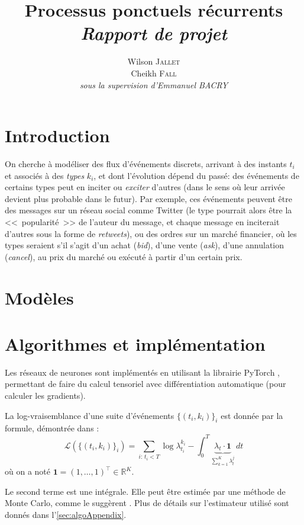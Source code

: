 \documentclass[11pt]{article}
\title{\textbf{Processus ponctuels récurrents}\\
	\textit{Rapport de projet}  
}
\author{
  Wilson \textsc{Jallet}\\
  Cheikh \textsc{Fall}\\
  \textit{sous la supervision d'Emmanuel BACRY}
}
\newcommand{\RR}{\mathbb{R}}
\begin{document}
\maketitle

\section{Introduction}

On cherche à modéliser des flux d'événements discrets, arrivant à des instants $t_i$ et associés à des \textit{types} $k_i$, et dont l'évolution dépend du passé: des événements de certains types peut en inciter ou \textit{exciter} d'autres (dans le sens où leur arrivée devient plus probable dans le futur). Par exemple, ces événements peuvent être des messages sur un réseau social comme Twitter (le type pourrait alors être la <<~popularité~>> de l'auteur du message, et chaque message en inciterait d'autres sous la forme de \textit{retweets}), ou des ordres sur un marché financier, où les types seraient s'il s'agit d'un achat (\textit{bid}), d'une vente (\textit{ask}), d'une annulation (\textit{cancel}), au prix du marché ou exécuté à partir d'un certain prix.

\section{Modèles}




\section{Algorithmes et implémentation}

Les réseaux de neurones sont implémentés en utilisant la librairie \textsf{PyTorch} \cite{paszke2017automatic}, permettant de faire du calcul tensoriel avec différentiation automatique (pour calculer les gradients).

La log-vraisemblance d'une suite d'événements $\{(t_i,k_i)\}_i$ est donnée par la formule, démontrée dans \autocite{meiEisnerNeuralHawkes}:
\begin{equation}\label{eq:explicitLikelihood}
\mathcal{L}\left(\{(t_i,k_i)\}_i\right)
=
\sum_{i:\,t_i < T} \log\lambda^{k_i}_{t_i} - \int_0^T \underbrace{\lambda_t\cdot\mathbf{1}}_{\sum_{k=1}^K\lambda^j_t}\,dt
\end{equation}
où on a noté $\mathbf{1} = {(1,\ldots,1)}^\intercal\in\RR^K$.

Le second terme est une intégrale. Elle peut être estimée par une méthode de Monte Carlo, comme le suggèrent \citeauthor{meiEisnerNeuralHawkes}. Plus de détails sur l'estimateur utilisé sont donnés dans l'\autoref{sec:algoAppendix}.
\end{document}
